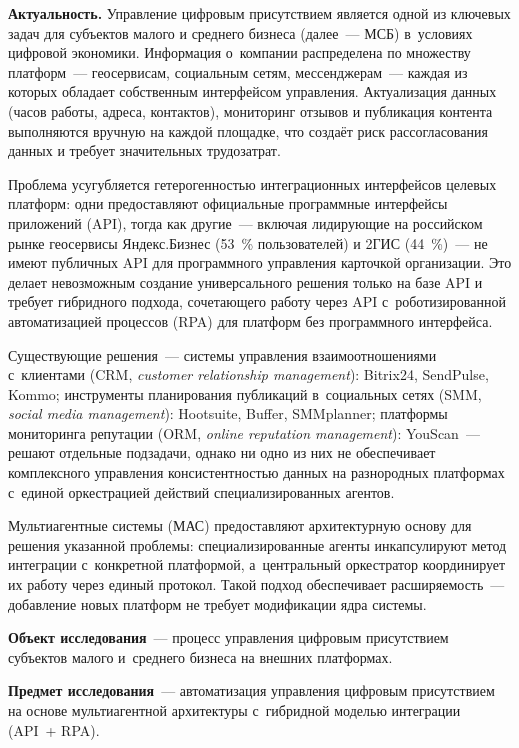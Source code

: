 \Introduction

\textbf{Актуальность.}
Управление цифровым присутствием является одной из ключевых задач для субъектов малого и среднего бизнеса (далее~--- МСБ) в~условиях цифровой экономики. Информация о~компании распределена по множеству платформ~--- геосервисам, социальным сетям, мессенджерам~--- каждая из которых обладает собственным интерфейсом управления. Актуализация данных (часов работы, адреса, контактов), мониторинг отзывов и публикация контента выполняются вручную на каждой площадке, что создаёт риск рассогласования данных и требует значительных трудозатрат.

Проблема усугубляется гетерогенностью интеграционных интерфейсов целевых платформ: одни предоставляют официальные программные интерфейсы приложений (API), тогда как другие~--- включая лидирующие на российском рынке геосервисы Яндекс.Бизнес (53~\% пользователей) и 2ГИС (44~\%)~--- не имеют публичных API для программного управления карточкой организации. Это делает невозможным создание универсального решения только на базе API и требует гибридного подхода, сочетающего работу через API с~роботизированной автоматизацией процессов (RPA) для платформ без программного интерфейса.

Существующие решения~--- системы управления взаимоотношениями с~клиентами (CRM, \textit{customer relationship management}): Bitrix24, SendPulse, Kommo; инструменты планирования публикаций в~социальных сетях (SMM, \textit{social media management}): Hootsuite, Buffer, SMMplanner; платформы мониторинга репутации (ORM, \textit{online reputation management}): YouScan~--- решают отдельные подзадачи, однако ни одно из них не обеспечивает комплексного управления консистентностью данных на разнородных платформах с~единой оркестрацией действий специализированных агентов.

Мультиагентные системы (МАС) предоставляют архитектурную основу для решения указанной проблемы: специализированные агенты инкапсулируют метод интеграции с~конкретной платформой, а~центральный оркестратор координирует их работу через единый протокол. Такой подход обеспечивает расширяемость~--- добавление новых платформ не требует модификации ядра системы.

\textbf{Объект исследования}~--- процесс управления цифровым присутствием субъектов малого и~среднего бизнеса на внешних платформах.

\textbf{Предмет исследования}~--- автоматизация управления цифровым присутствием на основе мультиагентной архитектуры с~гибридной моделью интеграции (API~+ RPA).

